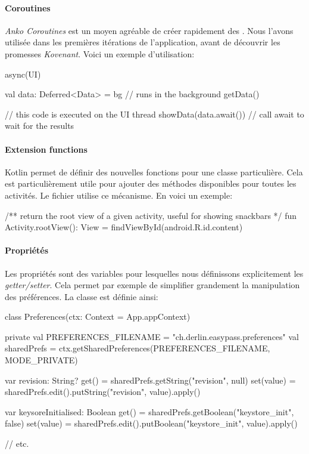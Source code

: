 \paragraph*{Coroutines} \emph{Anko Coroutines} est un moyen agréable de créer rapidement des . Nous l'avons utilisée dans les premières itérations de l'application, avant de découvrir les promesses \emph{Kovenant}. Voici un exemple d'utilisation:

\begin{kotlincode}
async(UI) {
    val data: Deferred<Data> = bg {
    // runs in the background
    getData()
    }

    // this code is executed on the UI thread
    showData(data.await()) // call await to wait for the results
}
\end{kotlincode}


\paragraph*{Extension functions} Kotlin permet de définir des nouvelles fonctions pour une classe particulière. Cela est particulièrement utile pour ajouter des méthodes disponibles pour toutes les activités. Le fichier  utilise ce mécanisme. En voici un exemple:

\begin{kotlincode}
/** return the root view of a given activity, useful for showing snackbars */
fun Activity.rootView(): View = findViewById(android.R.id.content)
\end{kotlincode}

\paragraph*{Propriétés} Les propriétés sont des variables pour lesquelles nous définissons explicitement les \emph{getter/setter}. Cela permet par exemple de simplifier grandement la manipulation des préférences. La classe  est définie ainsi:

\begin{kotlincode}
class Preferences(ctx: Context = App.appContext) {

    private val PREFERENCES_FILENAME = "ch.derlin.easypass.preferences"
    val sharedPrefs = ctx.getSharedPreferences(PREFERENCES_FILENAME, MODE_PRIVATE)
    
    var revision: String?
        get() = sharedPrefs.getString("revision", null)
        set(value) = sharedPrefs.edit().putString("revision", value).apply()
                
    var keysoreInitialised: Boolean
        get() = sharedPrefs.getBoolean("keystore_init", false)
        set(value) = sharedPrefs.edit().putBoolean("keystore_init", value).apply()

    // etc. 
}
\end{kotlincode}

